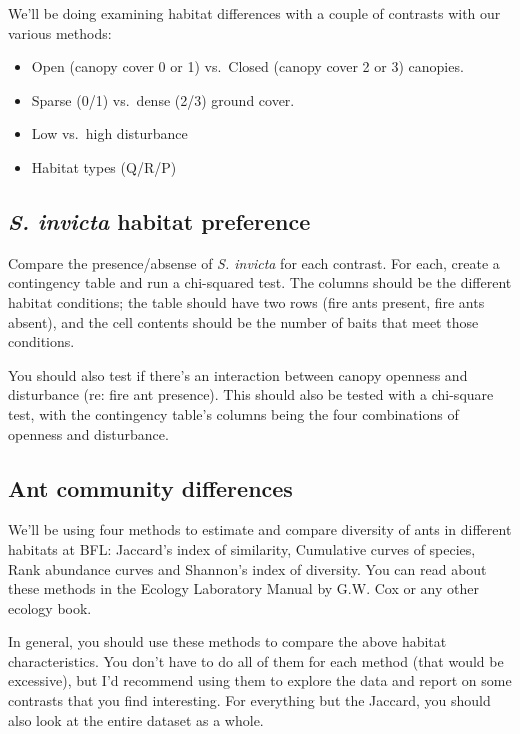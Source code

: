 \documentclass[]{book}
\providecommand{\tightlist}{%
  \setlength{\itemsep}{0pt}\setlength{\parskip}{0pt}}
\begin{document}
We'll be doing examining habitat differences with a couple of contrasts
with our various methods:

\begin{itemize}
\tightlist
\item
  Open (canopy cover 0 or 1) vs.~Closed (canopy cover 2 or 3) canopies.
\item
  Sparse (0/1) vs.~dense (2/3) ground cover.
\item
  Low vs.~high disturbance
\item
  Habitat types (Q/R/P)
\end{itemize}

\subsection{\texorpdfstring{\emph{S. invicta} habitat
preference}{S. invicta habitat preference}}\label{s.-invicta-habitat-preference}

Compare the presence/absense of \emph{S. invicta} for each contrast. For
each, create a contingency table and run a chi-squared test. The columns
should be the different habitat conditions; the table should have two
rows (fire ants present, fire ants absent), and the cell contents should
be the number of baits that meet those conditions.

You should also test if there's an interaction between canopy openness
and disturbance (re: fire ant presence). This should also be tested with
a chi-square test, with the contingency table's columns being the four
combinations of openness and disturbance.

\subsection{Ant community differences}\label{ant-community-differences}

We'll be using four methods to estimate and compare diversity of ants in
different habitats at BFL: Jaccard's index of similarity, Cumulative
curves of species, Rank abundance curves and Shannon's index of
diversity. You can read about these methods in the Ecology Laboratory
Manual by G.W. Cox or any other ecology book.

In general, you should use these methods to compare the above habitat
characteristics. You don't have to do all of them for each method (that
would be excessive), but I'd recommend using them to explore the data
and report on some contrasts that you find interesting. For everything
but the Jaccard, you should also look at the entire dataset as a whole.~
\end{document}
